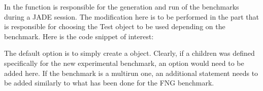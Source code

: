 \documentclass[letterpaper,10pt,english]{sphinxmanual}
\begin{document}
\sphinxAtStartPar
In  the function  is responsible for
the generation and run of the benchmarks during a JADE session. The modification here is to be performed
in the part that is responsible for choosing the Test object to be used depending on the benchmark.
Here is the code snippet of interest:

\begin{sphinxVerbatim}[commandchars=\\\{\}]

   
      

   
      

   
      

   
       

      

\end{sphinxVerbatim}

\sphinxAtStartPar
The default option is to simply create a  object. Clearly, if a children was defined
specifically for the new experimental benchmark, an option would need to be added here.
If the benchmark is a multirun one, an additional  statement needs to be added similarly
to what has been done for the FNG benchmark.
\end{document}
